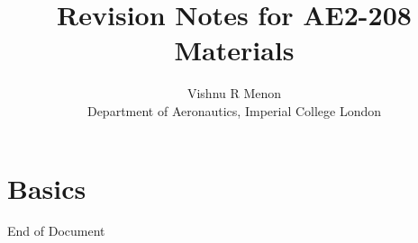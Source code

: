 \documentclass{summary_notes}
\begin{document}
\title{\bf Revision Notes for AE2-208 Materials}
\author{Vishnu R Menon\\ 
\small{Department of Aeronautics, Imperial College London}}
\maketitle
\begin{multicols*}{2}
\tableofcontents
\end{multicols*}
\newpage


\chapter{Basics}
\begin{multicols*}{2}






\end{multicols*}
\newpage
End of Document
\end{document}
